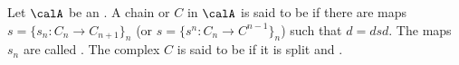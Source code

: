 \begin{definition} \label{definition:split_complex_in_an_additive_category}
    Let $\calA$ be an . 
    A chain or  $C$ in $\calA$ is said to be  if there are maps $s = \{s_n: C_n \to C_{n+1}\}_n$ (or $s = \{s^n: C_n \to C^{n-1}\}_n$) such that $d = dsd$. The maps $s_n$ are called .
    The complex $C$ is said to be  if it is split and .
\end{definition}